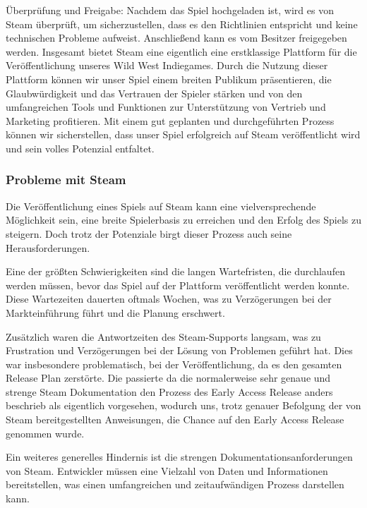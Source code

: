 Überprüfung und Freigabe: Nachdem das Spiel hochgeladen ist, wird es von Steam überprüft, um sicherzustellen, dass es den Richtlinien entspricht und keine technischen Probleme aufweist. Anschließend kann es vom Besitzer freigegeben werden.
%
Insgesamt bietet Steam eine eigentlich eine erstklassige Plattform für die Veröffentlichung unseres Wild West Indiegames.
Durch die Nutzung dieser Plattform können wir unser Spiel einem breiten Publikum präsentieren, die Glaubwürdigkeit und das Vertrauen der Spieler stärken und von den
umfangreichen Tools und Funktionen zur Unterstützung von Vertrieb und Marketing profitieren.
Mit einem gut geplanten und durchgeführten Prozess können wir sicherstellen, dass unser Spiel erfolgreich auf Steam veröffentlicht wird und sein volles Potenzial entfaltet.

 \subsubsection{Probleme mit Steam}\label{subsubsec:Steam-Herausforderungen}
Die Veröffentlichung eines Spiels auf Steam kann eine vielversprechende Möglichkeit sein, eine breite Spielerbasis zu erreichen und den Erfolg des Spiels zu steigern. Doch trotz der Potenziale birgt dieser Prozess auch seine Herausforderungen.

Eine der größten Schwierigkeiten sind die langen Wartefristen, die durchlaufen werden müssen, bevor das Spiel auf der Plattform veröffentlicht werden konnte. Diese Wartezeiten dauerten oftmals Wochen, was zu Verzögerungen bei der Markteinführung führt und die Planung erschwert.

Zusätzlich waren die Antwortzeiten des Steam-Supports langsam, was zu Frustration und Verzögerungen bei der Lösung von Problemen geführt hat. Dies war insbesondere problematisch, bei der Veröffentlichung, da es den gesamten Release Plan zerstörte.
Die passierte da die normalerweise sehr genaue und strenge Steam Dokumentation den Prozess des Early Access Release anders beschrieb als eigentlich vorgesehen, wodurch uns, trotz genauer Befolgung der von Steam bereitgestellten Anweisungen, die Chance auf den Early Access Release genommen wurde.

Ein weiteres generelles Hindernis ist die strengen Dokumentationsanforderungen von Steam. Entwickler müssen eine Vielzahl von Daten und Informationen bereitstellen, was einen umfangreichen und zeitaufwändigen Prozess darstellen kann.

